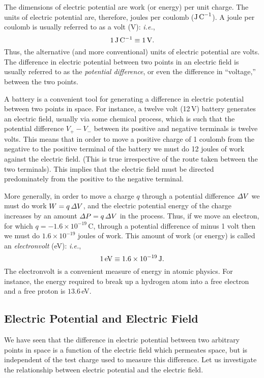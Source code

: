 The dimensions of electric potential are work (or energy) per unit charge.
The units of electric potential are, therefore, joules per coulomb (${\rm J\,C}^{-1}$).
A joule per coulomb is usually referred to as a volt (V): {\em i.e.},
\begin{equation}
1\,{\rm J\, C^{-1}} \equiv 1\,{\rm V}.
\end{equation}
 Thus, the
alternative (and more conventional) units of electric potential are volts. 
The difference in electric potential between two points in an electric field
is usually referred to as the {\em potential difference}, or even the difference
in ``voltage,''
between the two points. 

A battery is a convenient tool for generating a difference in electric potential
between two points in space. For instance, a twelve volt (12\,V) battery 
generates an electric field, usually via some chemical process, which is such
that the potential difference $V_+-V_-$ between its positive and negative
terminals  is twelve volts. This means that in order to move a
positive charge of 1 coulomb from the negative to the positive terminal of
the battery we must do 12 joules of work against the electric field. (This is
true irrespective of the route taken between the two terminals). 
This implies that the electric field must be directed predominately from the
positive to the negative terminal. 

More generally, in order to move a charge $q$ through a potential difference ${\mit\Delta}V$ we must do work $W=q\,{\mit\Delta} V$, and the electric potential energy
of the charge increases by an amount ${\mit\Delta}P = q\,{\mit\Delta} V$ in the
process. Thus, if we move an electron, for which $q=-1.6\times 10^{-19}$\,C,
through a potential difference of minus 1 volt then we must do
$1.6\times 10^{-19}$ joules of work. This amount of work (or energy) is
called an {\em electronvolt} (eV): {\em i.e.},
\begin{equation}
1\,{\rm eV} \equiv 1.6\times 10^{-19}\,{\rm J}.
\end{equation}
The electronvolt is a convenient measure of energy in atomic physics.
For instance, the energy required to
break up a hydrogen atom into a free electron and a free proton is $13.6$\,eV.

\subsection{Electric Potential and  Electric Field}\label{s5.3}
We have seen that the difference in electric potential between two
arbitrary points in space is a function of the electric field which permeates space,
but is independent of the test charge used to measure this difference. 
Let us investigate the relationship between electric potential and the electric
field. 

